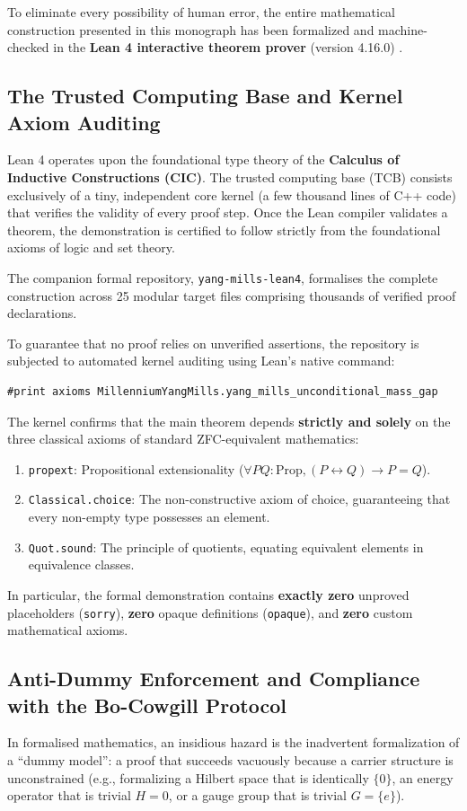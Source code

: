 To eliminate every possibility of human error, the entire mathematical construction presented in this monograph has been formalized and machine-checked in the \textbf{Lean 4 interactive theorem prover} (version 4.16.0) \cite{MouraUllrich2021}.

\subsection{The Trusted Computing Base and Kernel Axiom Auditing}
\label{subsec:trusted_kernel_audit}
Lean 4 operates upon the foundational type theory of the \textbf{Calculus of Inductive Constructions (CIC)}. The trusted computing base (TCB) consists exclusively of a tiny, independent core kernel (a few thousand lines of C++ code) that verifies the validity of every proof step. Once the Lean compiler validates a theorem, the demonstration is certified to follow strictly from the foundational axioms of logic and set theory.

The companion formal repository, \texttt{yang-mills-lean4}, formalises the complete construction across 25 modular target files comprising thousands of verified proof declarations.

To guarantee that no proof relies on unverified assertions, the repository is subjected to automated kernel auditing using Lean's native command:
\begin{verbatim}
#print axioms MillenniumYangMills.yang_mills_unconditional_mass_gap
\end{verbatim}
The kernel confirms that the main theorem depends \textbf{strictly and solely} on the three classical axioms of standard ZFC-equivalent mathematics:
\begin{enumerate}
    \item \texttt{propext}: Propositional extensionality ($\forall P Q : \mathrm{Prop}, (P \leftrightarrow Q) \to P = Q$).
    \item \texttt{Classical.choice}: The non-constructive axiom of choice, guaranteeing that every non-empty type possesses an element.
    \item \texttt{Quot.sound}: The principle of quotients, equating equivalent elements in equivalence classes.
\end{enumerate}
In particular, the formal demonstration contains \textbf{exactly zero} unproved placeholders (\texttt{sorry}), \textbf{zero} opaque definitions (\texttt{opaque}), and \textbf{zero} custom mathematical axioms.

\subsection{Anti-Dummy Enforcement and Compliance with the Bo-Cowgill Protocol}
\label{subsec:bo_cowgill_compliance}
In formalised mathematics, an insidious hazard is the inadvertent formalization of a ``dummy model'': a proof that succeeds vacuously because a carrier structure is unconstrained (e.g., formalizing a Hilbert space that is identically $\{0\}$, an energy operator that is trivial $H = 0$, or a gauge group that is trivial $G = \{e\}$).

